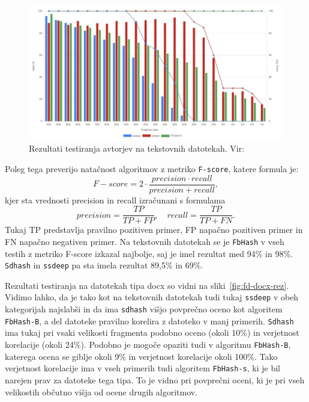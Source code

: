\documentclass{acm_proc_article-sp}
\begin{document}
\begin{figure}[htb]
\begin{center}
\includegraphics[width=1\columnwidth]{frag_det_text.png}
\end{center}
\caption{\small{Rezultati testiranja avtorjev na tekstovnih datotekah. Vir: \cite{fbhash}}}
\label{fig:fd-rez}
\end{figure}

Poleg tega preverijo natačnost algoritmov z metriko  \texttt{F-score}, katere formula je:
\begin{displaymath} F-score = 2\cdot\frac{precision\cdot recall}{precision + recall},\end{displaymath} 
kjer sta vrednosti precision in recall izračunani s formulama
\begin{displaymath} precision = \frac{TP}{TP + FP},\quad recall = \frac{TP}{TP+FN}.\end{displaymath} 
Tukaj TP predstavlja pravilno pozitiven primer, FP napačno pozitiven primer in FN napačno negativen primer. Na tekstovnih datotekah se je \texttt{FbHash} v vseh testih z metriko F-score izkazal najbolje, saj je imel rezultat med 94\% in 98\%. \texttt{Sdhash} in \texttt{ssdeep} pa sta imela rezultat 89,5\% in 69\%.

Rezultati testiranja na datotekah tipa docx so vidni na sliki~\ref{fig:fd-docx-rez}. Vidimo lahko, da je tako kot na tekstovnih datotekah tudi tukaj \texttt{ssdeep} v obeh kategorijah najslabši in da ima  \texttt{sdhash} višjo povprečno oceno kot algoritem \texttt{FbHash-B}, a del datoteke pravilno korelira z datoteko v manj primerih. \texttt{Sdhash} ima tukaj pri vsaki velikosti fragmenta podobno oceno (okoli 10\%) in verjetnost korelacije (okoli 24\%). Podobno je mogoče opaziti tudi v algoritmu \texttt{FbHash-B}, katerega ocena se giblje okoli 9\% in verjetnost korelacije okoli 100\%. Tako verjetnost korelacije ima v vseh primerih tudi algoritem \texttt{FbHash-s}, ki je bil narejen prav za datoteke tega tipa. To je vidno pri povprečni oceni, ki je pri vseh velikostih občutno višja od ocene drugih algoritmov.
\end{document}
